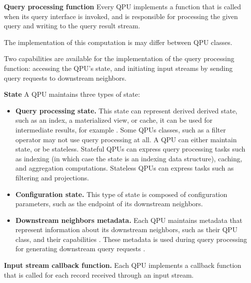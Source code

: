 \medskip

\noindent
\textbf{Query processing function}
Every QPU implements a function that is called when its query interface is invoked, and is responsible for processing
the given query and writing to the query result stream.

The implementation of this computation is may differ between QPU classes.

Two capabilities are available for the implementation of the query processing function:
accessing the QPU's state, and initiating input streams by sending query requests to downstream neighbors.

\medskip

\noindent
\textbf{State}
A QPU maintains three types of state:
\begin{itemize}

\item \textbf{Query processing state.}
This state can represent derived derived state, such as an index, a materialized view, or cache,
it can be used for intermediate results, for example .
Some QPUs classes, such as a filter operator may not use query processing at all.
A QPU can either maintain state, or be stateless.
Stateful QPUs can express query processing tasks such as indexing (in which case the state is an indexing data
structure), caching, and aggregation computations.
Stateless QPUs can express tasks such as filtering and projections.

\item \textbf{Configuration state.}
This type of state is composed of configuration parameters, such as the endpoint of its downstream neighbors.

\item \textbf{Downstream neighbors metadata.}
Each QPU maintains metadata that represent information about its downstream neighbors, such as their QPU class,
and their capabilities .
These metadata is used during query processing for generating downstream query requests .
\end{itemize}

\medskip

\noindent
\textbf{Input stream callback function.}
Each QPU implements a callback function that is called for each record received through an input stream.

\bigskip

